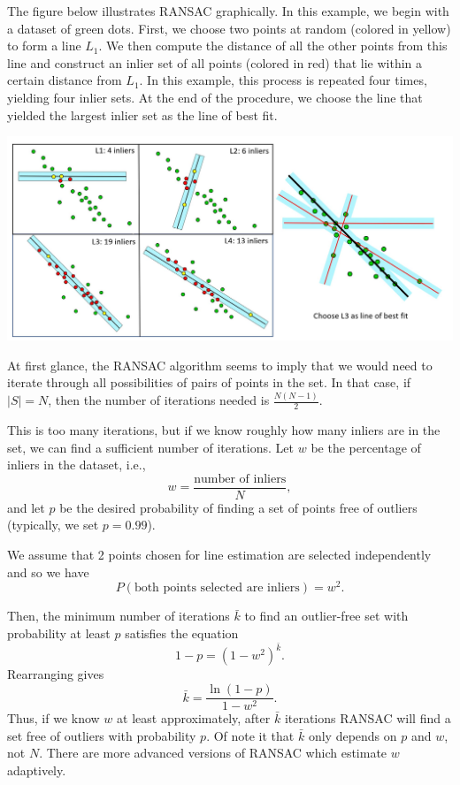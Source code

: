 \documentclass[twoside]{article}
\begin{document}
The figure below illustrates RANSAC graphically. In this example, we begin with a dataset of green dots. First, we choose two points at random (colored in yellow) to form a line $L_1$. We then compute the distance of all the other points from this line and construct an inlier set of all points (colored in red) that lie within a certain distance from $L_1$. In this example, this process is repeated four times, yielding four inlier sets. At the end of the procedure, we choose the line that yielded the largest inlier set as the line of best fit.

\begin{center}
	\includegraphics[width=\textwidth]{RANSAC}
\end{center}

At first glance, the RANSAC algorithm seems to imply that we would need to iterate through all possibilities of pairs of points in the set. In that case, if $|S| = N$, then the number of iterations needed is
$\frac{N(N-1)}{2}.$

This is too many iterations, but if we know roughly how many inliers are in the set, we can find a sufficient number of iterations. Let $w$ be the percentage of inliers in the dataset, i.e.,
$$w = \frac{\text{number of inliers}}{N},$$
and let $p$ be the desired probability of finding a set of points free of outliers (typically, we set $p=0.99$).

We assume that 2 points chosen for line estimation are selected independently and so we have
$$P(\text{both points selected are inliers}) = w^2.$$

Then, the minimum number of iterations $\bar{k}$ to find an outlier-free set with probability at least $p$ satisfies the equation
$$ 1-p = (1-w^2)^{\bar{k}}.$$
Rearranging gives $$\bar{k} = \frac{\ln(1-p)}{1-w^2}.$$
Thus, if we know $w$ at least approximately, after $\bar{k}$ iterations RANSAC will find a set free of outliers with probability $p$. Of note it that $\bar{k}$ only depends on $p$ and $w$, not $N$. There are more advanced versions of RANSAC which estimate $w$ adaptively.
\end{document}
